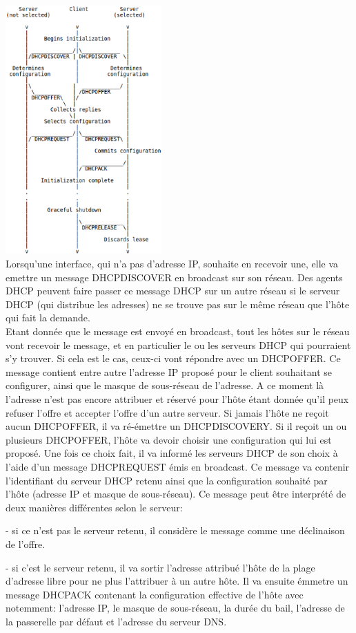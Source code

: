 \documentclass[twoside,openright,a4paper,11pt,french]{article}
\begin{document}
\includegraphics[width=6cm]{./pics/timeline_dhcp.eps}
\\
Lorsqu'une interface, qui n'a pas d'adresse IP, souhaite en recevoir une, elle va emettre un message DHCPDISCOVER en broadcast sur son réseau. Des agents DHCP peuvent faire passer ce message DHCP sur un autre réseau si le serveur DHCP (qui distribue les adresses) ne se trouve pas sur le même réseau que l'hôte qui fait la demande.
\\Etant donnée que le message est envoyé en broadcast, tout les hôtes sur le réseau vont recevoir le message, et en particulier le ou les serveurs DHCP qui pourraient s'y trouver. Si cela est le cas, ceux-ci vont répondre avec un DHCPOFFER. Ce message contient entre autre l'adresse IP proposé pour le client souhaitant se configurer, ainsi que le masque de sous-réseau de l'adresse. A ce moment là l'adresse n'est pas encore attribuer et réservé pour l'hôte étant donnée qu'il peux refuser l'offre et accepter l'offre d'un autre serveur. Si jamais l'hôte ne reçoit aucun DHCPOFFER, il va ré-émettre un DHCPDISCOVERY. Si il reçoit un ou plusieurs DHCPOFFER, l'hôte va devoir choisir une configuration qui lui est proposé. Une fois ce choix fait, il va informé les serveurs DHCP de son choix à l'aide d'un message DHCPREQUEST émis en broadcast. Ce message va contenir l'identifiant du serveur DHCP retenu ainsi que la configuration souhaité par l'hôte (adresse IP et masque de sous-réseau). Ce message peut être interprété de deux manières différentes selon le serveur:
\item- si ce n'est pas le serveur retenu, il considère le message comme une déclinaison de l'offre.
\item- si c'est le serveur retenu, il va sortir l'adresse attribué l'hôte de la plage d'adresse libre pour ne plus l'attribuer à un autre hôte. Il va ensuite émmetre un message DHCPACK contenant la configuration effective de l'hôte avec notemment: l'adresse IP, le masque de sous-réseau, la durée du bail, l'adresse de la passerelle par défaut et l'adresse du serveur DNS.
\end{document}
